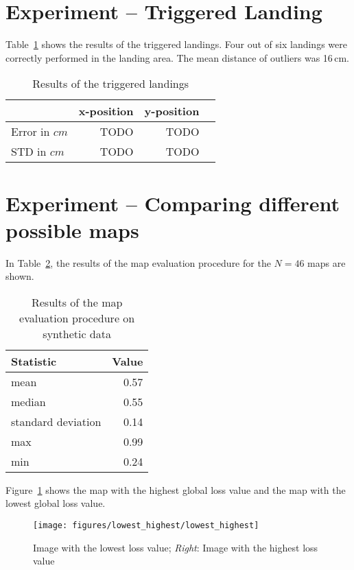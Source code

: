 \documentclass{report}
\begin{document}
\section{Experiment -- Triggered Landing}
\label{sec:landing}
Table~\ref{tab:targetlanding} shows the results of the triggered
landings. Four out of six landings were correctly performed in the
landing area. The mean distance of outliers was 16\,cm.
\begin{table}[H]
  \centering
  \begin{tabular}{lrrr}
    \toprule
    & x-position & y-position\\
    \midrule
    Error in $cm$ & TODO & TODO\\
    STD in $cm$ & TODO & TODO\\
    \bottomrule
  \end{tabular}
  \caption[Triggered landings]{Results of the triggered landings}
  \label{tab:targetlanding}

\end{table}

\section{Experiment -- Comparing different possible maps}
\label{sec:experiment-maps}

In Table~\ref{tab:mapeval}, the results of the map evaluation
procedure for the $N = 46$ maps are shown.

\begin{table}[h]
  \centering
  \begin{tabular}{lr}
    \toprule
    Statistic & Value\\
    \midrule
    mean & 0.57\\
    median & 0.55\\
    standard deviation & 0.14\\
    max & 0.99\\
    min & 0.24\\    
    \bottomrule
  \end{tabular}
  \caption[Map evaluation procedure on synthetic data]{Results of the map evaluation procedure on synthetic data}
  \label{tab:mapeval}

\end{table}

Figure~\ref{fig:minmaximg} shows the map with the highest global loss
value and the map with the lowest global loss value.

\begin{figure}[h!]
\begin{center}
\texttt{[image: figures/lowest\_highest/lowest\_highest]}
\caption{{\label{fig:minmaximg}
Image with the lowest loss value; \emph{Right}:
    Image with the highest loss value%
}}
\end{center}
\end{figure}
\end{document}
